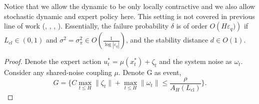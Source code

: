 \documentclass{article}
\begin{document}
\begin{remark}
    Notice that we allow the dynamic to be only locally contractive and we also allow stochastic dynamic and expert policy here. This setting is not covered in previous line of work (\citet{pfrommer2022tasil}, \citet{block2023provable}, \citet{simchowitz2025pitfalls}, \citet{zhang2025imitation}). Essentially, the failure probability $\delta$ is of order $O\left(H\varepsilon_q)\right)$ if $L_{cl}\in (0,1)$ and $\sigma^2=\sigma_{\pi}^2\in O({\frac{1}{\log|\varepsilon_q|}})$, and the stability distance $d\in O(1)$. 
\end{remark}


\begin{proof}
    Denote the expert action $u_t^*=\mu(x_t^*)+\zeta_t$ and the system noise as $\omega_t$. Consider any shared-noise coupling $\mu$. Denote G as event,
    \begin{equation*}
        G=\{C\max_{t\leq H}\|\zeta_t\|+\max_{t\leq H}\|\omega_t\|\leq \frac{\rho}{A_H(L_{\text{cl}})}\}.
    \end{equation*}


\end{proof}
\end{document}

